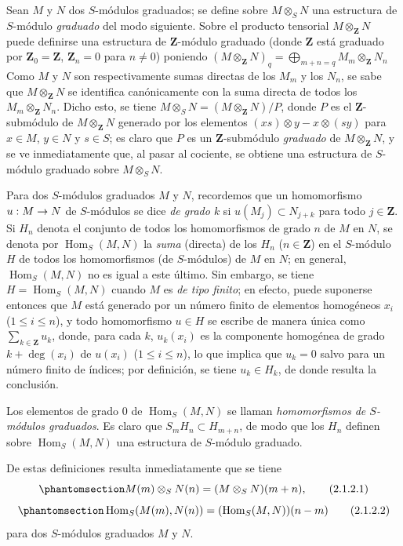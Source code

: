 \documentclass[oneside,10pt]{amsart}
\makeatletter
\renewcommand{\leq}{\leqslant}
\newcommand{\ega@arrow}[2]{\mathchoice{#1}{#2}{#2}{#2}}
\renewcommand{\to}{\ega@arrow{\longrightarrow}{\rightarrow}}
\let\EGAOriginalLabel\label
\renewcommand{\label}[1]{\phantomsection\EGAOriginalLabel{#1}}
\makeatother
\begin{document}
\begin{env}[2.1.2]
\label{II.2.1.2-fr}
Sean $M$ y $N$ dos $S$-módulos graduados; se define sobre $M\otimes_S N$ una estructura de $S$-módulo \emph{graduado} del modo siguiente.
Sobre el producto tensorial $M\otimes_{\mathbf{Z}}N$ puede definirse una estructura de $\mathbf{Z}$-módulo graduado (donde $\mathbf{Z}$ está graduado por $\mathbf{Z}_0=\mathbf{Z}$, $\mathbf{Z}_n=0$ para $n\ne0$) poniendo
$(M\otimes_{\mathbf{Z}}N)_q=\bigoplus_{m+n=q}M_m\otimes_{\mathbf{Z}}N_n$
Como $M$ y $N$ son respectivamente sumas directas de los $M_m$ y los $N_n$, se sabe que $M\otimes_{\mathbf{Z}}N$ se identifica canónicamente con la suma directa de todos los $M_m\otimes_{\mathbf{Z}}N_n$.
Dicho esto, se tiene $M\otimes_S N=(M\otimes_{\mathbf{Z}}N)/P$, donde $P$ es el $\mathbf{Z}$-submódulo de $M\otimes_{\mathbf{Z}}N$ generado por los elementos $(xs)\otimes y-x\otimes(sy)$ para $x\in M$, $y\in N$ y $s\in S$; es claro que $P$ es un $\mathbf{Z}$-submódulo \emph{graduado} de $M\otimes_{\mathbf{Z}}N$, y se ve inmediatamente que, al pasar al cociente, se obtiene una estructura de $S$-módulo graduado sobre $M\otimes_S N$.

Para dos $S$-módulos graduados $M$ y $N$, recordemos que un homomorfismo $u:M\to N$ de $S$-módulos se dice \emph{de grado $k$} si $u(M_j)\subset N_{j+k}$ para todo $j\in\mathbf{Z}$.
Si $H_n$ denota el conjunto de todos los homomorfismos de grado $n$ de $M$ en $N$, se denota por $\operatorname{Hom}_S(M,N)$ la \emph{suma} (directa) de los $H_n$ ($n\in\mathbf{Z}$) en el $S$-módulo $H$ de todos los homomorfismos (de $S$-módulos) de $M$ en $N$; en general, $\operatorname{Hom}_S(M,N)$ no es igual a este último.
Sin embargo, se tiene $H=\operatorname{Hom}_S(M,N)$ cuando $M$ es \emph{de tipo finito}; en efecto, puede suponerse entonces que $M$ está generado por un número finito de elementos homogéneos $x_i$ ($1\leq i\leq n$), y todo homomorfismo $u\in H$ se escribe de manera única como $\sum_{k\in\mathbf{Z}}u_k$, donde, para cada $k$, $u_k(x_i)$ es la componente homogénea de grado $k+\deg(x_i)$ de $u(x_i)$ ($1\leq i\leq n$), lo que implica que $u_k=0$ salvo para un número finito de índices; por definición, se tiene $u_k\in H_k$, de donde resulta la conclusión.

Los elementos de grado $0$ de $\operatorname{Hom}_S(M,N)$ se llaman \emph{homomorfismos de $S$-módulos graduados}.
Es claro que $S_mH_n\subset H_{m+n}$, de modo que los $H_n$ definen sobre $\operatorname{Hom}_S(M,N)$ una estructura de $S$-módulo graduado.

De estas definiciones resulta inmediatamente que se tiene
\[
  \label{II.2.1.2.1-fr}
  M(m)\otimes_S N(n)=(M\otimes_S N)(m+n),
  \tag{2.1.2.1}
\]
\[
  \label{II.2.1.2.2-fr}
  \operatorname{Hom}_S(M(m),N(n))
  =(\operatorname{Hom}_S(M,N))(n-m)
  \tag{2.1.2.2}
\]
para dos $S$-módulos graduados $M$ y $N$.


\end{env}
\end{document}
